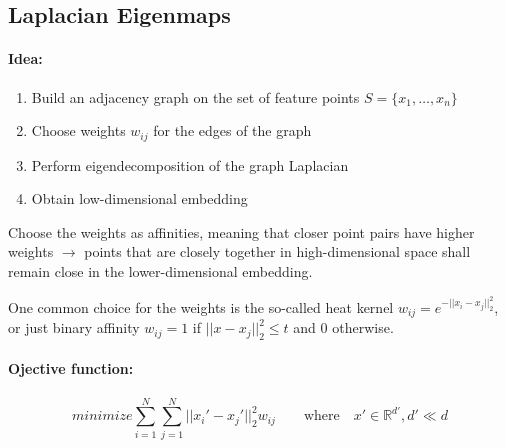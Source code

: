 
\subsection*{Laplacian Eigenmaps}

%
%
%

\paragraph{Idea:}
\begin{enumerate}
    \item
        Build an adjacency graph on the set of feature points \(S=\{x_1, \dots, x_n\}\)
    \item
        Choose weights \(w_{ij}\) for the edges of the graph
    \item
        Perform eigendecomposition of the graph Laplacian
    \item
        Obtain low-dimensional embedding
\end{enumerate}
Choose the weights as affinities, meaning that closer point pairs have higher weights \(\rightarrow\) points that are closely together in high-dimensional space shall remain close in the lower-dimensional embedding.

One common choice for the weights is the so-called heat kernel \(w_{ij} = e^{-||x_i - x_j||_2^2}\), or just binary affinity
$w_{ij} = 1$ if $ ||x-x_j||_2^2 \leq t $ and  $0$ otherwise.

\bigbreak

\paragraph{Ojective function:}
\[minimize \sum_{i=1}^{N}\sum_{j=1}^{N}||x_i'- x_j'||_2^2 w_{ij} \qquad \text{where} \quad x'\in \mathbb{R}^{d'}, d' \ll d \]

